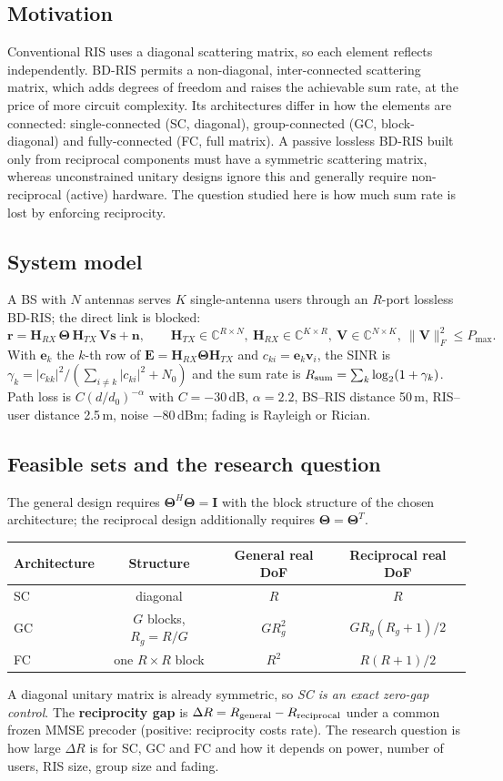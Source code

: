 \documentclass[10pt,a4paper]{article}
\newcommand{\THT}{\boldsymbol{\Theta}}
\begin{document}
\subsection{Motivation}
Conventional RIS uses a diagonal scattering matrix, so each element reflects independently. BD-RIS permits a non-diagonal, inter-connected scattering matrix, which adds degrees of freedom and raises the achievable sum rate, at the price of more circuit complexity. Its architectures differ in how the elements are connected: single-connected (SC, diagonal), group-connected (GC, block-diagonal) and fully-connected (FC, full matrix). A passive lossless BD-RIS built only from reciprocal components must have a symmetric scattering matrix, whereas unconstrained unitary designs ignore this and generally require non-reciprocal (active) hardware. The question studied here is how much sum rate is lost by enforcing reciprocity.

\subsection{System model}
A BS with $N$ antennas serves $K$ single-antenna users through an $R$-port lossless BD-RIS; the direct link is blocked:
\[
\mathbf r=\mathbf H_{RX}\,\THT\,\mathbf H_{TX}\,\mathbf V\mathbf s+\mathbf n,\qquad
\mathbf H_{TX}\in\mathbb C^{R\times N},\ \mathbf H_{RX}\in\mathbb C^{K\times R},\ \mathbf V\in\mathbb C^{N\times K},\ \|\mathbf V\|_F^2\le P_{\max}.
\]
With $\mathbf e_k$ the $k$-th row of $\mathbf E=\mathbf H_{RX}\THT\mathbf H_{TX}$ and $c_{ki}=\mathbf e_k\mathbf v_i$, the SINR is $\gamma_k=|c_{kk}|^2/(\sum_{i\ne k}|c_{ki}|^2+N_0)$ and the sum rate is $R_{\rm sum}=\sum_k\log_2(1+\gamma_k)$. Path loss is $C(d/d_0)^{-\alpha}$ with $C=-30$\,dB, $\alpha=2.2$, BS--RIS distance 50\,m, RIS--user distance 2.5\,m, noise $-80$\,dBm; fading is Rayleigh or Rician.

\subsection{Feasible sets and the research question}
The general design requires $\THT^H\THT=\mathbf I$ with the block structure of the chosen architecture; the reciprocal design additionally requires $\THT=\THT^T$.
\begin{table}[H]\centering\small
\begin{tabular}{@{}lccc@{}}\toprule
Architecture & Structure & General real DoF & Reciprocal real DoF\\\midrule
SC & diagonal & $R$ & $R$\\
GC & $G$ blocks, $R_g=R/G$ & $G R_g^2$ & $G R_g(R_g{+}1)/2$\\
FC & one $R\times R$ block & $R^2$ & $R(R{+}1)/2$\\\bottomrule
\end{tabular}
\end{table}
A diagonal unitary matrix is already symmetric, so \emph{SC is an exact zero-gap control}. The \textbf{reciprocity gap} is $\Delta R=R_{\rm general}-R_{\rm reciprocal}$ under a common frozen MMSE precoder (positive: reciprocity costs rate). The research question is how large $\Delta R$ is for SC, GC and FC and how it depends on power, number of users, RIS size, group size and fading.
\end{document}
